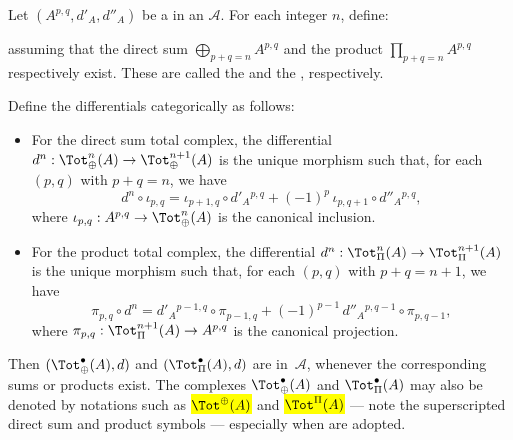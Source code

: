 \begin{definition} \label{definition:total_complexes_of_a_double_complex_of_objects_in_an_additive_category}
Let $(A^{p,q},d'_A,d''_A)$ be a  in an  $\mathcal{A}$. For each integer $n$, define:


assuming that the direct sum $\bigoplus_{p+q=n} A^{p,q}$ and the product $\prod_{p+q=n} A^{p,q}$ respectively exist.
These are called the  and the , respectively.

Define the differentials categorically as follows:

\begin{itemize}
  \item For the direct sum total complex, the differential $d^n : \Tot_{\oplus}^n(A) \to \Tot_{\oplus}^{n+1}(A)$ is the unique morphism such that, for each $(p,q)$ with $p+q=n$, we have
    \[
    d^n \circ \iota_{p,q} =
      \iota_{p+1,q} \circ d'_A {}^{p,q}
      + (-1)^p\, \iota_{p,q+1} \circ d''_A {}^{p,q},
    \]
    where $\iota_{p,q} : A^{p,q} \to \Tot_{\oplus}^n(A)$ is the canonical inclusion.

  \item For the product total complex, the differential $d^n : \Tot_{\Pi}^n(A) \to \Tot_{\Pi}^{n+1}(A)$ is the unique morphism such that, for each $(p,q)$ with $p+q=n+1$, we have
    \[
    \pi_{p,q} \circ d^n =
      d'_A {}^{p-1,q} \circ \pi_{p-1,q}
      + (-1)^{p-1}\, d''_A {}^{p,q-1} \circ \pi_{p,q-1},
    \]
    where $\pi_{p,q} : \Tot_{\Pi}^{n+1}(A) \to A^{p,q}$ is the canonical projection.
\end{itemize}

Then $(\Tot_{\oplus}^\bullet(A), d)$ and $(\Tot_{\Pi}^\bullet(A), d)$ are 
 in~$\mathcal{A}$, whenever the corresponding sums or products exist. 
The complexes $\Tot_{\oplus}^\bullet(A)$ and $\Tot_{\Pi}^\bullet(A)$ may also be denoted by notations such as \hl{$\Tot^{\oplus}(A)$} and \hl{$\Tot^{\Pi}(A)$} --- note the superscripted direct sum and product symbols --- especially when  are adopted.
\end{definition}
